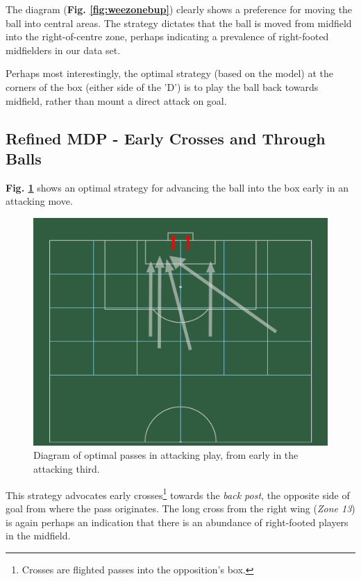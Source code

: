 \documentclass{l4proj}
\begin{document}
The diagram (\textbf{Fig. \ref{fig:weezonebup}}) clearly shows a preference for moving the ball into central areas. The strategy dictates that the ball is moved from midfield into the right-of-centre zone, perhaps indicating a prevalence of right-footed midfielders in our data set. 

Perhaps most interestingly, the optimal strategy (based on the model) at the corners of the box (either side of the 'D') is to play the ball back towards midfield, rather than mount a direct attack on goal.

\subsection{Refined MDP - Early Crosses and Through Balls}

\textbf{Fig. \ref{fig:weezoneearl}} shows an optimal strategy for advancing the ball into the box early in an attacking move.

\begin{figure}[h]
    \centering
    \includegraphics[scale=0.1]{images/earlynthrough.png}   
    \caption{Diagram of optimal passes in attacking play, from early in the attacking third.}
    \label{fig:weezoneearl} 
\end{figure}

This strategy advocates early crosses\footnote{Crosses are flighted passes into the opposition's box.} towards the \textit{back post}, the opposite side of goal from where the pass originates. The long cross from the right wing (\textit{Zone 13}) is again perhaps an indication that there is an abundance of right-footed players in the midfield. 
\end{document}
